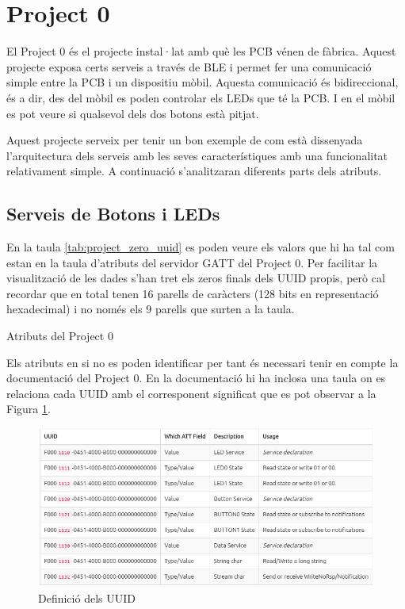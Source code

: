 \section{Project 0}
El Project 0 és el projecte instal·lat amb què les PCB vénen de fàbrica.
Aquest projecte exposa certs serveis a través de BLE i permet fer una comunicació simple entre la PCB i un dispositiu mòbil.
Aquesta comunicació és bidireccional, és a dir, des del mòbil es poden controlar els LEDs que té la PCB.
I en el mòbil es pot veure si qualsevol dels dos botons està pitjat.

Aquest projecte serveix per tenir un bon exemple de com està dissenyada l'arquitectura dels serveis amb les seves característiques amb una funcionalitat relativament simple. A continuació s'analitzaran diferents parts dels atributs.

\subsection{Serveis de Botons i LEDs}

En la taula \ref{tab:project_zero_uuid} es poden veure els valors que hi ha tal com estan en la taula d'atributs del servidor GATT del Project 0.
Per facilitar la visualització de les dades s'han tret els zeros finals dels UUID propis, però cal recordar que en total tenen 16 parells de caràcters (128 bits en representació hexadecimal) i no només els 9 parells que surten a la taula.

\begin{table}[h!]
	\begin{center}
		\caption{Atributs del Project 0}
		\label{tab:project_zero_uuid}
	\end{center}
\end{table}

Els atributs en si no es poden identificar per tant és necessari tenir en compte la documentació del Project 0.
En la documentació hi ha inclosa una taula on es relaciona cada UUID amb el corresponent significat que es pot observar a la Figura \ref{project0_table}.

\begin{figure}[h!]
	\begin{center}
		\includegraphics[width=\textwidth]{./images/Project_0_UUID.png}
		\caption{Definició dels UUID \cite{project0_UUIDs}}
		\label{project0_table}
	\end{center}
\end{figure}

